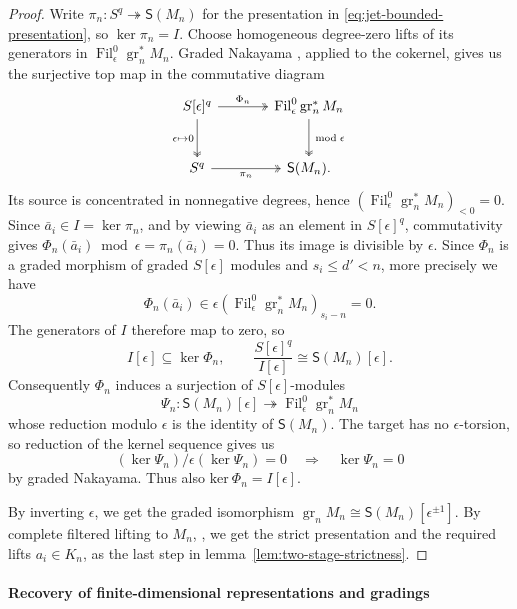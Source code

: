 \documentclass[11pt]{article}
\theoremstyle{definition}
\newcommand{\gr}{\operatorname{gr}}
\newcommand{\Fil}{\operatorname{Fil}}
\begin{document}
\begin{proof}
Write $\pi_n:S^{q}\twoheadrightarrow\mathsf S(M_n)$ for the
presentation in \eqref{eq:jet-bounded-presentation}, so $\ker\pi_n=I$.
Choose homogeneous degree-zero lifts of its generators in
$\Fil_\epsilon^0\gr_n^*M_n$. Graded Nakayama
\cite[Lemma~6.2]{NegronPevtsova2023}, applied to the cokernel,
gives us the surjective top map in the commutative diagram
\[
\begin{tikzcd}[column sep=large,row sep=large]
 S[\epsilon]^{q}\arrow[r,two heads,"\Phi_n"]
   \arrow[d,two heads,"\epsilon\mapsto0"']
 &\Fil_\epsilon^0\gr_n^*M_n
   \arrow[d,two heads,"\bmod\epsilon"]\\
 S^{q}\arrow[r,two heads,"\pi_n"']
 &\mathsf S(M_n).
\end{tikzcd}
\]
Its source is concentrated in nonnegative degrees, hence
$(\Fil_\epsilon^0\gr_n^*M_n)_{<0}=0$.
Since $\bar a_i\in I=\ker\pi_n$, and by viewing 
$\bar a_i$ as an element in $S[\epsilon]^q$, commutativity gives
\(
 \Phi_n(\bar a_i)\bmod\epsilon
   =\pi_n(\bar a_i)=0.
\)
Thus its image is divisible by $\epsilon$. Since $\Phi_n$ is a graded morphism 
of graded $S[\epsilon]$ modules and $s_i\leq d'<n$, more precisely we have
\[
 \Phi_n(\bar a_i)
 \in\epsilon(\Fil_\epsilon^0\gr_n^*M_n)_{s_i-n}=0.
\]
The generators of $I$ therefore map to zero, so
\[
 I[\epsilon]\subseteq\ker\Phi_n,\qquad
 \frac{S[\epsilon]^{q}}{I[\epsilon]}
       \cong\mathsf S(M_n)[\epsilon].
\]
Consequently $\Phi_n$ induces a surjection of $S[\epsilon]$-modules
\[
 \Psi_n:\mathsf S(M_n)[\epsilon]
       \twoheadrightarrow\Fil_\epsilon^0\gr_n^*M_n
\]
whose reduction modulo $\epsilon$ is the identity of $\mathsf S(M_n)$.
The target has no $\epsilon$-torsion, so reduction of the kernel
sequence gives us
\[
 (\ker\Psi_n)/\epsilon(\ker\Psi_n)=0
 \quad\Rightarrow\quad\ker\Psi_n=0
\]
by graded Nakayama. Thus also $\mathrm{ker}\ \Phi_n=I[\epsilon]$.

By inverting $\epsilon$, we get the 
graded isomorphism $\gr_nM_n\cong\mathsf{S}(M_n)[\epsilon^{\pm1}]$.
By complete filtered lifting to $M_n$, \cite[Theorem~I.4.2.4.(5)]{LvO96},
we get the strict presentation and the required lifts $a_i\in K_n$, as the last step in lemma~\ref{lem:two-stage-strictness}.
\end{proof}

\paragraph{Recovery of finite-dimensional representations and gradings}
\end{document}
